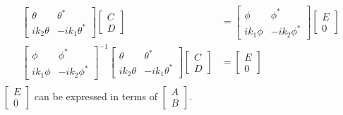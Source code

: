 \documentclass[letter, 10pts]{article}
\begin{document}
\begin{align*}
	\begin{bmatrix} \theta & \theta ^{*} \\ 
	i k_2 \theta & - i k_1 \theta^{*} \end{bmatrix} 
		\begin{bmatrix} C \\ D \end{bmatrix}  &= 
		\begin{bmatrix} \phi & \phi^{*} \\ i k_1 \phi & - i k_2 \phi^{*}  \end{bmatrix} 
		\begin{bmatrix} E \\ 0 \end{bmatrix}  \\ 
		\begin{bmatrix} \phi & \phi^{*} \\ i k_1 \phi & - i k_2 \phi^{*}  \end{bmatrix} ^{-1}
	\begin{bmatrix} \theta & \theta ^{*} \\ 
	i k_2 \theta & - i k_1 \theta^{*} \end{bmatrix} 
		\begin{bmatrix} C \\ D \end{bmatrix}  &= 
		\begin{bmatrix} E \\ 0 \end{bmatrix}  \\ 
\end{align*}
$\begin{bmatrix} E\\0 \end{bmatrix} $ can be expressed in terms of $\begin{bmatrix} A \\ B \end{bmatrix} $.
\end{document}
